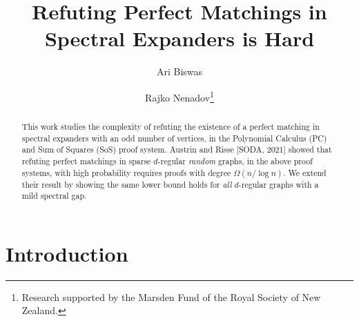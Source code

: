 \documentclass[11pt]{article}
\title{Refuting Perfect Matchings in Spectral Expanders is Hard}
\author[1]{Ari Biswas}
\author[2]{Rajko Nenadov\thanks{Research supported by the Marsden Fund of the Royal Society of New Zealand.}}
\affil[1]{\small University Of Warwick, United Kingdom}
\affil[2]{\small University Of Auckland, New Zealand}
\date{}
\begin{document}
\maketitle
\begin{abstract}
This work studies the complexity of refuting the existence of a perfect matching in spectral expanders with an odd number of vertices, in the Polynomial Calculus (PC) and Sum of Squares (SoS) proof system.
Austrin and Risse [SODA, 2021] showed that refuting perfect matchings in sparse $d$-regular \emph{random} graphs, in the above proof systems, with high probability requires proofs with degree $\Omega(n/\log n)$. 
We extend their result by showing the same lower bound holds for \emph{all} $d$-regular graphs with a mild spectral gap.
\end{abstract}

\section{Introduction}


\end{document}
